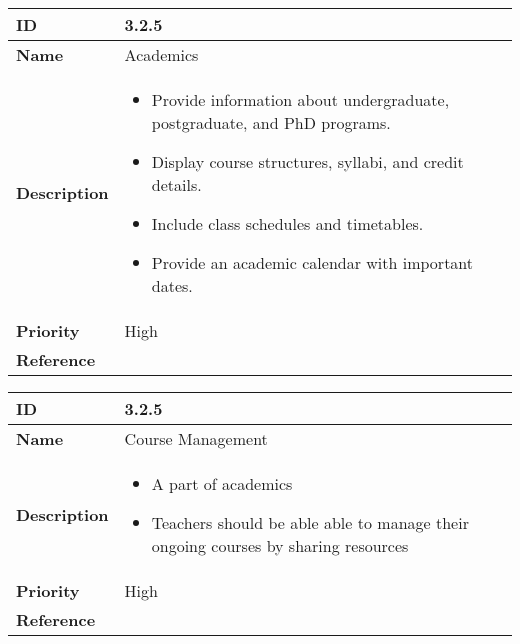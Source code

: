 \begin{center}
\begin{tabular}{ | >{\bfseries}m{5em} | m{10cm} |  } 
  \hline
  ID & 3.2.5\\  
  \hline
  Name & Academics \\  
  \hline
  Description & 
  \begin{itemize}
      \item Provide information about undergraduate, postgraduate, and PhD programs.
      \item Display course structures, syllabi, and credit details.
      \item Include class schedules and timetables.
      \item Provide an academic calendar with important dates.
  \end{itemize} \\ 
  \hline
  Priority & High\\
  \hline 
  Reference & \\
  \hline
\end{tabular}
\end{center}

\vspace{0.5cm}

\begin{center}
  \begin{tabular}{ | >{\bfseries}m{5em} | m{10cm} |  } 
    \hline
    ID & 3.2.5\\  
    \hline
    Name & Course Management \\  
    \hline
    Description & 
    \begin{itemize}
      \item A part of academics
      \item Teachers should be able able to manage their ongoing courses by sharing resources
    \end{itemize} \\ 
    \hline
    Priority & High\\
    \hline 
    Reference & \\
    \hline
  \end{tabular}
  \end{center}
  
  \vspace{0.5cm}

